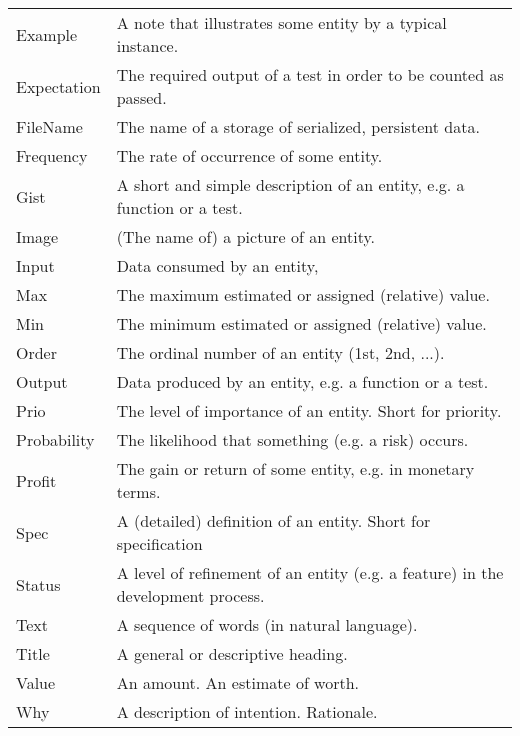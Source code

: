 \documentclass[a4paper]{llncs}
\begin{document}
\begin{minipage}{1\linewidth}
\begin{minipage}{0.47\textwidth}
\begin{table}[H]
\begin{tabular}{|l p{4.3cm}|}
Example&A note that illustrates some entity by a  typical instance.\\
Expectation&The required output of a test in order to be counted as passed.\\
FileName&The name of a storage of serialized, persistent data.\\
Frequency&The rate of occurrence of some entity. \\
Gist&A short and simple description of an entity, e.g. a function or a test.\\
Image&(The name of) a picture of an entity.\\
Input&Data consumed by an entity, \\
Max&The maximum estimated or assigned (relative) value.\\
Min&The minimum estimated or assigned (relative) value.\\
Order&The ordinal number of an entity (1st, 2nd, ...).\\
Output&Data produced by an entity, e.g. a function or a test.\\
Prio&The level of importance of an entity. Short for priority.\\
Probability&The likelihood that something (e.g. a risk) occurs.\\
Profit&The gain or return of some entity, e.g. in monetary terms.\\
Spec&A (detailed) definition of an entity. Short for specification\\
Status&A level of refinement of an entity (e.g. a feature) in the development process. \\
Text&A sequence of words (in natural language).\\
Title&A general or descriptive heading.\\
Value&An amount. An estimate of worth.\\
Why&A description of intention. Rationale.\\


\end{tabular}
\end{table}
\end{minipage}
\end{minipage}
\end{document}
